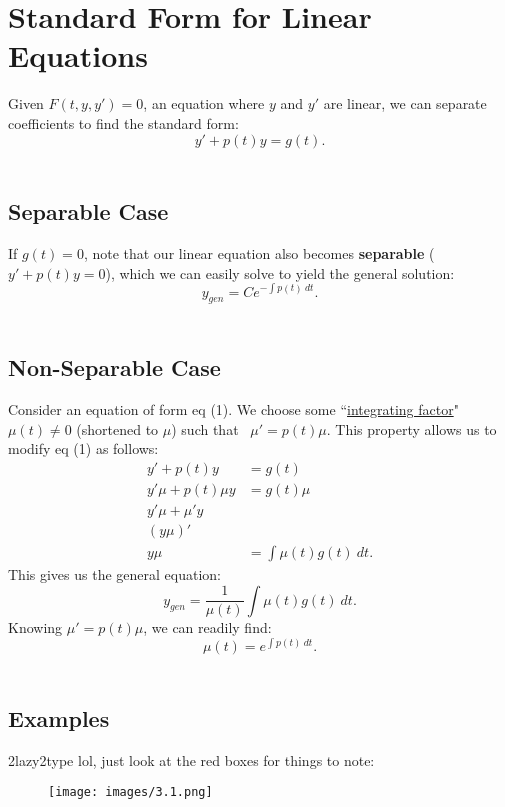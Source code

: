 \documentclass{article}
\begin{document}


\section{Standard Form for Linear Equations}

Given $F( t,y,y') =0$, an equation where $y$ and $y'$ are linear, we can separate coefficients to find the standard form:
\begin{equation}
\boxed{y'+p( t) y=g( t)} .
\end{equation}
\
\subsection{Separable Case}

If $g( t) =0$, note that our linear equation also becomes \textbf{separable} ($y'+p( t) y=0$), which we can easily solve to yield the general solution:
\begin{equation}
\boxed{y_{gen} =Ce^{-\int p( t) \ dt}} .
\end{equation}
\
\subsection{Non-Separable Case}

Consider an equation of form eq (1). We choose some ``\underline{integrating factor}" $\mu ( t) \neq 0$ (shortened to $\mu $) such that \ $\mu '=p( t) \mu $. This property allows us to modify eq (1) as follows:
\begin{align*}
y'+p( t) y & =g( t)\\
y'\mu +p( t) \mu y & =g( t) \mu \\
y'\mu +\mu 'y & \\
( y\mu ) ' & \\
y\mu  & =\int \mu ( t) g( t) \ dt.
\end{align*}
This gives us the general equation:
\begin{equation}
\boxed{y_{gen} =\frac{1}{\mu ( t)}\int \mu ( t) g( t) \ dt.}
\end{equation}
Knowing $\mu '=p( t) \mu $, we can readily find:
\begin{equation}
\boxed{\mu ( t) =e^{\int p( t) \ dt} .}
\end{equation}
\
\newpage
\subsection{Examples}

2lazy2type lol, just look at the red boxes for things to note:

\begin{figure}[htp]
    \centering
    \texttt{[image: images/3.1.png]}
\end{figure}






\end{document}
